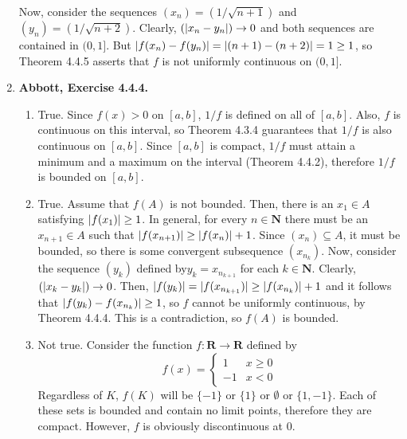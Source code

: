 \documentclass{article}
\DeclarePairedDelimiter\abs{\lvert}{\rvert}
\newcommand{\N}{\mathbf{N}}
\newcommand{\R}{\mathbf{R}}
\newcommand{\set}[1]{\{#1\}}
\newcommand{\exc}[2][Abbott]{\item \textbf{#1, Exercise #2.}}
\begin{document}
\begin{enumerate}
    Now, consider the sequences $(x_n) = (1/\sqrt{n+1})$ and $(y_n) = (1/\sqrt{n+2})$. Clearly, $(\abs{x_n-y_n}) \to 0$ and both sequences are contained in $(0, 1]$. But $\abs{f(x_n)-f(y_n)} = \abs{(n+1)-(n+2)} = 1 \geq 1$, so Theorem 4.4.5 asserts that $f$ is not uniformly continuous on $(0, 1]$.
    
    \exc{4.4.4}
    \begin{enumerate}
        \item True. Since $f(x) > 0$ on $[a, b]$, $1/f$ is defined on all of $[a, b]$. Also, $f$ is continuous on this interval, so Theorem 4.3.4 guarantees that $1/f$ is also continuous on $[a, b]$. Since $[a, b]$ is compact, $1/f$ must attain a minimum and a maximum on the interval (Theorem 4.4.2), therefore $1/f$ is bounded on $[a, b]$.
        
        \item True. Assume that $f(A)$ is not bounded. Then, there is an $x_1 \in A$ satisfying $\abs{f(x_1)} \geq 1$. In general, for every $n \in \N$ there must be an $x_{n+1} \in A$ such that $\abs{f(x_{n+1})} \geq \abs{f(x_n)} + 1$. Since $(x_n) \subseteq A$, it must be bounded, so there is some convergent subsequence $(x_{n_k})$. Now, consider the sequence $(y_k)$ defined by$y_k = x_{n_{k+1}}$ for each $k \in \N$. Clearly, $(\abs{x_k-y_k}) \to 0$. Then, $\abs{f(y_k)} = \abs{f(x_{n_{k+1}})} \geq \abs{f(x_{n_k})} + 1$ and it follows that $\abs{f(y_k)-f(x_{n_k})} \geq 1$, so $f$ cannot be uniformly continuous, by Theorem 4.4.4. This is a contradiction, so $f(A)$ is bounded.
        
        \item Not true. Consider the function $f : \R \to \R$ defined by
        \begin{equation*}
            f(x) = \begin{cases}
            1 & x \geq 0 \\ 
            -1 & x < 0
            \end{cases}
        \end{equation*} Regardless of $K$, $f(K)$ will be $\set{-1}$ or $\set{1}$ or $\emptyset$ or $\set{1, -1}$. Each of these sets is bounded and contain no limit points, therefore they are compact. However, $f$ is obviously discontinuous at $0$.
        \end{enumerate}
        

\end{enumerate}
\end{document}
